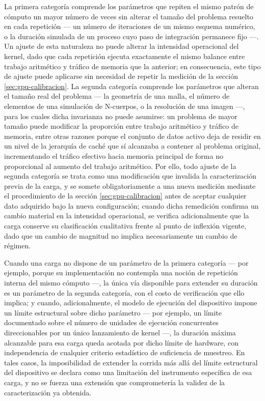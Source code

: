 \documentclass[12pt,oneside,spanish]{book}
\begin{document}
La primera categoría comprende los parámetros que repiten el mismo patrón de cómputo un mayor número de veces sin alterar el tamaño del problema resuelto en cada repetición --- un número de iteraciones de un mismo esquema numérico, o la duración simulada de un proceso cuyo paso de integración permanece fijo ---. Un ajuste de esta naturaleza no puede alterar la intensidad operacional del kernel, dado que cada repetición ejecuta exactamente el mismo balance entre trabajo aritmético y tráfico de memoria que la anterior; en consecuencia, este tipo de ajuste puede aplicarse sin necesidad de repetir la medición de la sección \ref{sec:gpu-calibracion}. La segunda categoría comprende los parámetros que alteran el tamaño real del problema --- la geometría de una malla, el número de elementos de una simulación de N-cuerpos, o la resolución de una imagen ---, para los cuales dicha invarianza no puede asumirse: un problema de mayor tamaño puede modificar la proporción entre trabajo aritmético y tráfico de memoria, entre otras razones porque el conjunto de datos activo deja de residir en un nivel de la jerarquía de caché que sí alcanzaba a contener al problema original, incrementando el tráfico efectivo hacia memoria principal de forma no proporcional al aumento del trabajo aritmético. Por ello, todo ajuste de la segunda categoría se trata como una modificación que invalida la caracterización previa de la carga, y se somete obligatoriamente a una nueva medición mediante el procedimiento de la sección \ref{sec:gpu-calibracion} antes de aceptar cualquier dato adquirido bajo la nueva configuración; cuando dicha remedición confirma un cambio material en la intensidad operacional, se verifica adicionalmente que la carga conserve su clasificación cualitativa frente al punto de inflexión vigente, dado que un cambio de magnitud no implica necesariamente un cambio de régimen.

Cuando una carga no dispone de un parámetro de la primera categoría --- por ejemplo, porque su implementación no contempla una noción de repetición interna del mismo cómputo ---, la única vía disponible para extender su duración es un parámetro de la segunda categoría, con el costo de verificación que ello implica; y cuando, adicionalmente, el modelo de ejecución del dispositivo impone un límite estructural sobre dicho parámetro --- por ejemplo, un límite documentado sobre el número de unidades de ejecución concurrentes direccionables por un único lanzamiento de kernel ---, la duración máxima alcanzable para esa carga queda acotada por dicho límite de hardware, con independencia de cualquier criterio estadístico de suficiencia de muestreo. En tales casos, la imposibilidad de extender la corrida más allá del límite estructural del dispositivo se declara como una limitación del instrumento específica de esa carga, y no se fuerza una extensión que comprometería la validez de la caracterización ya obtenida.
\end{document}
